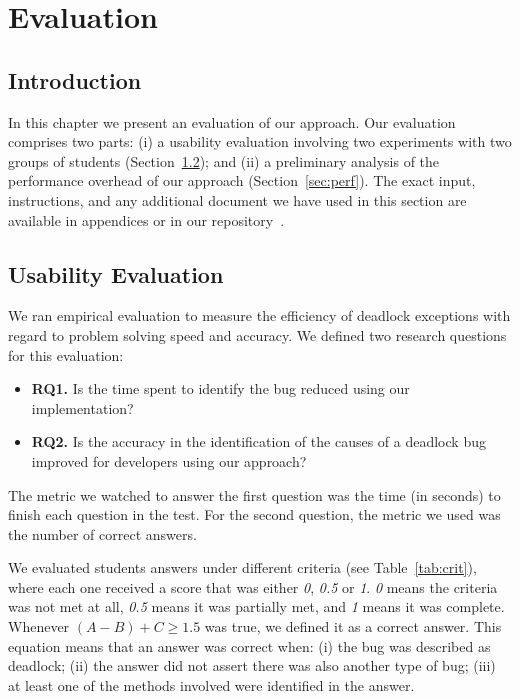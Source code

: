 \chapter{Evaluation}
\label{evaluation}

\section{Introduction}

In this chapter we present an evaluation of our approach. Our evaluation comprises two parts:
(i) a usability evaluation involving two experiments with two groups of students (Section~\ref{sec:usab});
and (ii) a preliminary analysis of the performance overhead of our approach (Section~\ref{sec:perf}).
The exact input, instructions, and any additional document we have used in this section are available in appendices or in our repository~\citep{repo}.

\section{Usability Evaluation}\label{sec:usab}

We ran empirical evaluation to measure the efficiency of deadlock exceptions with regard to problem solving speed and accuracy.
We defined two research questions for this evaluation: 

\begin{itemize}
\item {\bf RQ1.} Is the time spent to identify the bug reduced using our implementation?
\item {\bf RQ2.} Is the accuracy in the identification of the causes of a deadlock bug improved for developers using our approach?
\end{itemize}

The metric we watched to answer the first question was the time (in seconds) to finish each question in the test.
For the second question, the metric we used was the number of correct answers.

We evaluated students answers under different criteria (see Table~\ref{tab:crit}), where each one received a score that was either \emph{0}, \emph{0.5} or \emph{1}.
\emph{0} means the criteria was not met at all,
\emph{0.5} means it was partially met,
and \emph{1} means it was complete.
Whenever $(A - B) + C \geq 1.5$ was true, we defined it as a correct answer.
This equation means that an answer was correct when:
(i) the bug was described as deadlock;
(ii) the answer did not assert there was also another type of bug;
(iii) at least one of the methods involved were identified in the answer.

